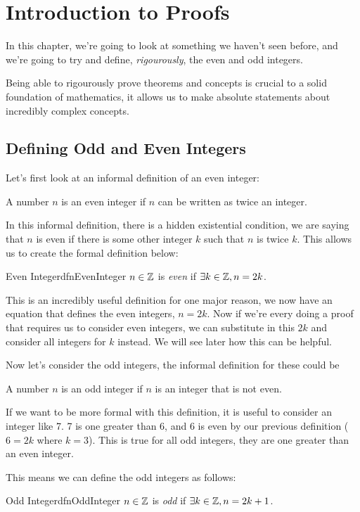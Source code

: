 \chapter{Introduction to Proofs}
In this chapter, we're going to look at something we haven't seen before, and we're going to try and define, \emph{rigourously}, the even and odd integers.

Being able to rigourously prove theorems and concepts is crucial to a solid foundation of mathematics, it allows us to make absolute statements about incredibly complex concepts.

\section{Defining Odd and Even Integers}
Let's first look at an informal definition of an even integer:

\begin{center}
    A number $n$ is an even integer if $n$ can be written as twice an integer.
\end{center}
In this informal definition, there is a hidden existential condition, we are saying that $n$ is even if there is some other integer $k$ such that $n$ is twice $k$. This allows us to create the formal definition below:

\begin{dfn}[label={def:evenInteger}]{Even Integer}{dfnEvenInteger}
    $n \in \mathbb{Z}$ is \emph{even} if $\exists k \in \mathbb{Z}, n = 2k$.
\end{dfn}
This is an incredibly useful definition for one major reason, we now have an equation that defines the even integers, $n = 2k$. Now if we're every doing a proof that requires us to consider even integers, we can substitute in this $2k$ and consider all integers for $k$ instead. We will see later how this can be helpful.

Now let's consider the odd integers, the informal definition for these could be
\begin{center}
    A number $n$ is an odd integer if $n$ is an integer that is not even.
\end{center}
If we want to be more formal with this definition, it is useful to consider an integer like 7. 7 is one greater than 6, and 6 is even by our previous definition ($6 = 2k$ where $k = 3$). This is true for all odd integers, they are one greater than an even integer.

This means we can define the odd integers as follows:
\begin{dfn}[label={def:oddInteger}]{Odd Integer}{dfnOddInteger}
    $n \in \mathbb{Z}$ is \emph{odd} if $\exists k \in \mathbb{Z}, n = 2k + 1$.
\end{dfn}

